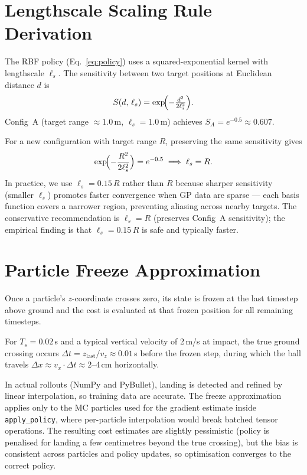 \section{Lengthscale Scaling Rule Derivation}
\label{app:lengthscale}

The RBF policy (Eq.~\ref{eq:policy}) uses a squared-exponential kernel with
lengthscale $\ell_s$.
The sensitivity between two target positions at Euclidean distance $d$ is
\[
  S(d,\, \ell_s) = \exp\!\Bigl(-\tfrac{d^2}{2\ell_s^2}\Bigr).
\]
Config~A (target range $\approx 1.0$\,m, $\ell_s = 1.0$\,m) achieves
$S_A = e^{-0.5} \approx 0.607$.

For a new configuration with target range $R$, preserving the same sensitivity gives
\[
  \exp\!\Bigl(-\frac{R^2}{2\ell_s^2}\Bigr) = e^{-0.5}
  \implies \ell_s = R.
\]
In practice, we use $\ell_s = 0.15\,R$ rather than $R$ because sharper sensitivity
(smaller $\ell_s$) promotes faster convergence when GP data are sparse — each
basis function covers a narrower region, preventing aliasing across nearby targets.
The conservative recommendation is $\ell_s = R$ (preserves Config~A sensitivity);
the empirical finding is that $\ell_s = 0.15\,R$ is safe and typically faster.

\section{Particle Freeze Approximation}
\label{app:freeze}

Once a particle's $z$-coordinate crosses zero, its state is frozen at the last
timestep above ground and the cost is evaluated at that frozen position for all
remaining timesteps.

For $T_s = 0.02$\,s and a typical vertical velocity of 2\,m/s at impact, the true
ground crossing occurs $\Delta t = z_{\mathrm{last}}/v_z \approx 0.01$\,s before the
frozen step, during which the ball travels $\Delta x \approx v_x \cdot \Delta t
\approx 2$--4\,cm horizontally.

In actual rollouts (NumPy and PyBullet), landing is detected and refined by linear
interpolation, so training data are accurate.
The freeze approximation applies only to the MC particles used for the gradient
estimate inside \texttt{apply\_policy}, where per-particle interpolation would break
batched tensor operations.
The resulting cost estimates are slightly pessimistic (policy is penalised for landing
a few centimetres beyond the true crossing), but the bias is consistent across
particles and policy updates, so optimisation converges to the correct policy.
